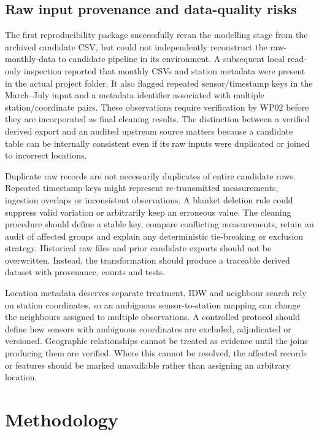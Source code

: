 \documentclass[12pt,a4paper,oneside]{report}
\begin{document}
\section{Raw input provenance and data-quality risks}
The first reproducibility package successfully reran the modelling stage from the archived candidate CSV, but could not independently reconstruct the raw-monthly-data to candidate pipeline in its environment. A subsequent local read-only inspection reported that monthly CSVs and station metadata were present in the actual project folder. It also flagged repeated sensor/timestamp keys in the March--July input and a metadata identifier associated with multiple station/coordinate pairs. These observations require verification by WP02 before they are incorporated as final cleaning results. The distinction between a verified derived export and an audited upstream source matters because a candidate table can be internally consistent even if its raw inputs were duplicated or joined to incorrect locations.

Duplicate raw records are not necessarily duplicates of entire candidate rows. Repeated timestamp keys might represent re-transmitted measurements, ingestion overlaps or inconsistent observations. A blanket deletion rule could suppress valid variation or arbitrarily keep an erroneous value. The cleaning procedure should define a stable key, compare conflicting measurements, retain an audit of affected groups and explain any deterministic tie-breaking or exclusion strategy. Historical raw files and prior candidate exports should not be overwritten. Instead, the transformation should produce a traceable derived dataset with provenance, counts and tests.

Location metadata deserves separate treatment. IDW and neighbour search rely on station coordinates, so an ambiguous sensor-to-station mapping can change the neighbours assigned to multiple observations. A controlled protocol should define how sensors with ambiguous coordinates are excluded, adjudicated or versioned. Geographic relationships cannot be treated as evidence until the joins producing them are verified. Where this cannot be resolved, the affected records or features should be marked unavailable rather than assigning an arbitrary location.

\chapter{Methodology}
\end{document}
